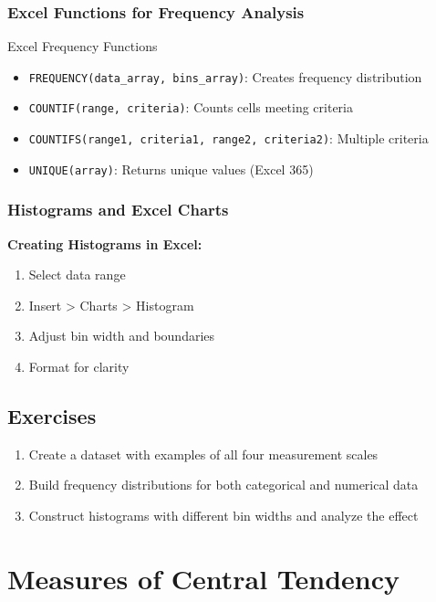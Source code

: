 \documentclass[12pt,a4paper]{book}
\begin{document}
\subsection{Excel Functions for Frequency Analysis}

\begin{example}{Excel Frequency Functions}
\begin{itemize}
    \item \texttt{FREQUENCY(data\_array, bins\_array)}: Creates frequency distribution
    \item \texttt{COUNTIF(range, criteria)}: Counts cells meeting criteria
    \item \texttt{COUNTIFS(range1, criteria1, range2, criteria2)}: Multiple criteria
    \item \texttt{UNIQUE(array)}: Returns unique values (Excel 365)
\end{itemize}
\end{example}

\subsection{Histograms and Excel Charts}

\textbf{Creating Histograms in Excel:}
\begin{enumerate}
    \item Select data range
    \item Insert > Charts > Histogram
    \item Adjust bin width and boundaries
    \item Format for clarity
\end{enumerate}

\section{Exercises}

\begin{enumerate}
    \item Create a dataset with examples of all four measurement scales
    \item Build frequency distributions for both categorical and numerical data
    \item Construct histograms with different bin widths and analyze the effect
\end{enumerate}

\chapter{Measures of Central Tendency}
\end{document}
